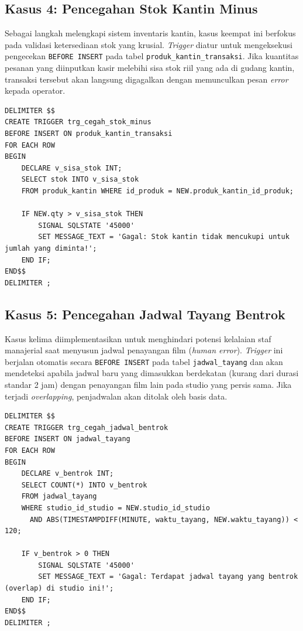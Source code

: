 \documentclass[letter,12pt,bahasa]{article}
\begin{document}
\subsection{Kasus 4: Pencegahan Stok Kantin Minus}
Sebagai langkah melengkapi sistem inventaris kantin, kasus keempat ini berfokus pada validasi ketersediaan stok yang krusial. \textit{Trigger} diatur untuk mengeksekusi pengecekan \texttt{BEFORE INSERT} pada tabel \texttt{produk\_kantin\_transaksi}. Jika kuantitas pesanan yang diinputkan kasir melebihi sisa stok riil yang ada di gudang kantin, transaksi tersebut akan langsung digagalkan dengan memunculkan pesan \textit{error} kepada operator.

\begin{lstlisting}[style=sql, caption={\textit{Trigger} 4 --- \texttt{Pencegahan Stok Minus}}, label={lst:trg4}]
DELIMITER $$
CREATE TRIGGER trg_cegah_stok_minus
BEFORE INSERT ON produk_kantin_transaksi
FOR EACH ROW
BEGIN
    DECLARE v_sisa_stok INT;
    SELECT stok INTO v_sisa_stok
    FROM produk_kantin WHERE id_produk = NEW.produk_kantin_id_produk;
    
    IF NEW.qty > v_sisa_stok THEN
        SIGNAL SQLSTATE '45000'
        SET MESSAGE_TEXT = 'Gagal: Stok kantin tidak mencukupi untuk jumlah yang diminta!';
    END IF;
END$$
DELIMITER ;
\end{lstlisting}

\subsection{Kasus 5: Pencegahan Jadwal Tayang Bentrok}
Kasus kelima diimplementasikan untuk menghindari potensi kelalaian staf manajerial saat menyusun jadwal penayangan film (\textit{human error}). \textit{Trigger} ini berjalan otomatis secara \texttt{BEFORE INSERT} pada tabel \texttt{jadwal\_tayang} dan akan mendeteksi apabila jadwal baru yang dimasukkan berdekatan (kurang dari durasi standar 2 jam) dengan penayangan film lain pada studio yang persis sama. Jika terjadi \textit{overlapping}, penjadwalan akan ditolak oleh basis data.

\begin{lstlisting}[style=sql, caption={\textit{Trigger} 5 --- \texttt{Pencegahan Jadwal Bentrok}}, label={lst:trg5}]
DELIMITER $$
CREATE TRIGGER trg_cegah_jadwal_bentrok
BEFORE INSERT ON jadwal_tayang
FOR EACH ROW
BEGIN
    DECLARE v_bentrok INT;
    SELECT COUNT(*) INTO v_bentrok
    FROM jadwal_tayang
    WHERE studio_id_studio = NEW.studio_id_studio
      AND ABS(TIMESTAMPDIFF(MINUTE, waktu_tayang, NEW.waktu_tayang)) < 120;
      
    IF v_bentrok > 0 THEN
        SIGNAL SQLSTATE '45000'
        SET MESSAGE_TEXT = 'Gagal: Terdapat jadwal tayang yang bentrok (overlap) di studio ini!';
    END IF;
END$$
DELIMITER ;
\end{lstlisting}
\end{document}

